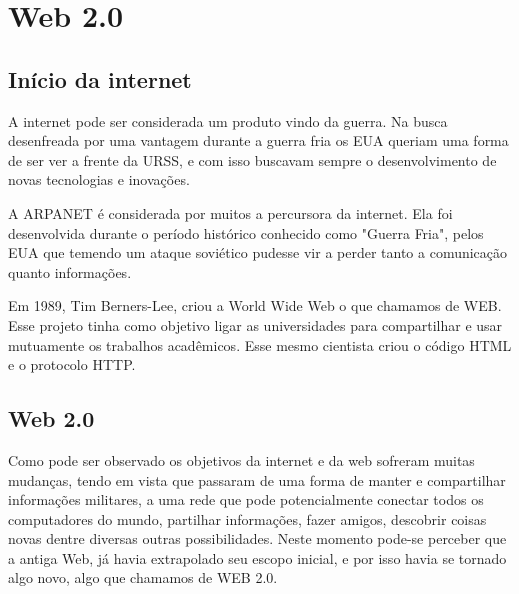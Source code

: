 \documentclass[
	12pt,				%
	openright,			%
	twoside,			%
	a4paper,			%
	Times,
	brazil,				%
	]{abntex2}
\begin{document}
%


\section{Web 2.0}

\subsection{ Início da internet}
\par
A internet pode ser considerada um produto vindo da guerra. Na busca desenfreada por uma vantagem durante a guerra fria os EUA queriam uma forma de ser ver a frente da URSS, e com isso buscavam sempre o desenvolvimento de novas tecnologias e inovações. \cite{historia-internt}

\par
A ARPANET é considerada por muitos a percursora da internet. Ela foi desenvolvida durante o período histórico conhecido como "Guerra Fria", pelos EUA que temendo um ataque soviético pudesse vir a perder tanto a comunicação quanto informações. \cite{historia-internt}
\par

Em 1989, Tim Berners-Lee, criou a World Wide Web o que chamamos de WEB. Esse projeto tinha como objetivo ligar as universidades para compartilhar e usar mutuamente os trabalhos acadêmicos. Esse mesmo cientista criou o código HTML e o protocolo HTTP.  \cite{web}
\par

\subsection{Web 2.0}

Como pode ser observado os objetivos da internet e da web sofreram muitas mudanças, tendo em vista que passaram de uma forma de manter e compartilhar informações militares, a uma rede que pode potencialmente conectar todos os computadores do mundo, partilhar informações, fazer amigos, descobrir coisas novas dentre diversas outras possibilidades. Neste momento pode-se perceber que a antiga Web, já havia extrapolado seu escopo inicial, e por isso havia se tornado algo novo, algo que chamamos de WEB 2.0. \cite{historia-internt, web, web2.0}
\par
\end{document}
